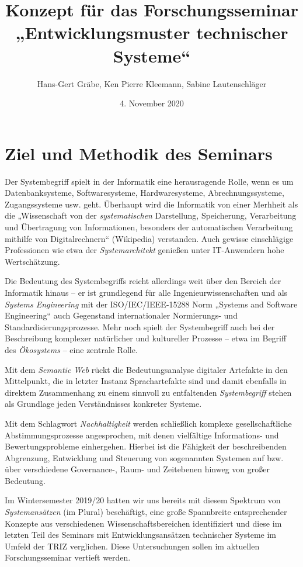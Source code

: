 \documentclass[11pt,a4paper]{article}
\title{Konzept für das Forschungsseminar\\ „Entwicklungsmuster technischer
  Systeme“}
\author{Hans-Gert Gr\"abe, Ken Pierre Kleemann, Sabine Lautenschläger}
\date{4. November 2020}
\begin{document}
\maketitle

\section{Ziel und Methodik des Seminars}

Der Systembegriff spielt in der Informatik eine herausragende Rolle, wenn es
um Datenbanksysteme, Softwaresysteme, Hardwaresysteme, Abrechnungssysteme,
Zugangssysteme usw. geht.  Überhaupt wird die Informatik von einer Merhheit
als die „Wissenschaft von der \emph{systematischen} Darstellung, Speicherung,
Verarbeitung und Übertragung von Informationen, besonders der automatischen
Verarbeitung mithilfe von Digitalrechnern“ (Wikipedia) verstanden.  Auch
gewisse einschlägige Professionen wie etwa der \emph{Systemarchitekt} genießen
unter IT-Anwendern hohe Wertschätzung.

Die Bedeutung des Systembegriffs reicht allerdings weit über den Bereich der
Informatik hinaus -- er ist grundlegend für alle Ingenieurwissenschaften und
als \emph{Systems Engineering} mit der ISO/IEC/IEEE-15288 Norm „Systems and
Software Engineering“ auch Gegenstand internationaler Normierungs- und
Standardisierungsprozesse.  Mehr noch spielt der Systembegriff auch bei der
Beschreibung komplexer natürlicher und kultureller Prozesse -- etwa im Begriff
des \emph{Ökosystems} -- eine zentrale Rolle.

Mit dem \emph{Semantic Web} rückt die Bedeutungsanalyse digitaler Artefakte in
den Mittelpunkt, die in letzter Instanz Sprachartefakte sind und damit
ebenfalls in direktem Zusammenhang zu einem sinnvoll zu entfaltenden
\emph{Systembegriff} stehen als Grundlage jeden Verständnisses konkreter
Systeme.

Mit dem Schlagwort \emph{Nachhaltigkeit} werden schließlich komplexe
gesellschaftliche Abstimmungsprozesse angesprochen, mit denen vielfältige
Informations- und Bewertungsprobleme einhergehen. Hierbei ist die Fähigkeit
der beschreibenden Abgrenzung, Entwicklung und Steuerung von sogenannten
Systemen auf bzw. über verschiedene Governance-, Raum- und Zeitebenen hinweg
von großer Bedeutung.

Im Wintersemester 2019/20 hatten wir uns bereits mit diesem Spektrum von
\emph{Systemansätzen} (im Plural) beschäftigt, eine große Spannbreite
entsprechender Konzepte aus verschiedenen Wissenschaftsbereichen identifiziert
und diese im letzten Teil des Seminars mit Entwicklungsansätzen technischer
Systeme im Umfeld der TRIZ verglichen.  Diese Untersuchungen sollen im
aktuellen Forschungsseminar vertieft werden.
\newpage
\end{document}
